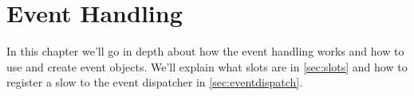 \section{Event Handling}
\label{sec:eventhandling}

In this chapter we'll go in depth about how the event handling works and how 
to use and create event objects. We'll explain what slots are in 
\cref{sec:slots} and how to register a slow to the event dispatcher in 
\cref{sec:eventdispatch}.



